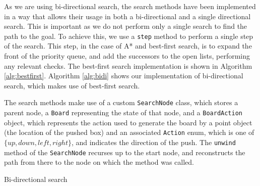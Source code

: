 \documentclass[a4paper,11pt]{article}
\begin{document}
As we are using bi-directional search, the search methods have been implemented
in a way that allows their usage in both a bi-directional and a single
directional search. This is important as we do not perform only a single search
to find the path to the goal. To achieve this, we use a \texttt{step} method to
perform a single step of the search. This step, in the case of A* and best-first
search, is to expand the front of the priority queue, and add the successors to
the open lists, performing any relevant checks. The best-first search
implementation is shown in Algorithm \ref{alg:bestfirst}. Algorithm
\ref{alg:bidi} shows our implementation of bi-directional search, which makes
use of best-first search.

The search methods make use of a custom \texttt{SearchNode} class, which stores
a parent node, a \texttt{Board} representing the state of that node, and a
\texttt{BoardAction} object, which represents the action used to generate the
board by a point object (the location of the pushed box) and an associated
\texttt{Action} enum, which is one of $\{up, down, left, right\}$, and indicates
the direction of the push. The \texttt{unwind} method of the \texttt{SearchNode}
recurses up to the start node, and reconstructs the path from there to the node
on which the method was called.

\begin{algorithm}
  \DontPrintSemicolon

\caption{Bi-directional search}
\label{alg:bidi}
\end{algorithm}
\end{document}
